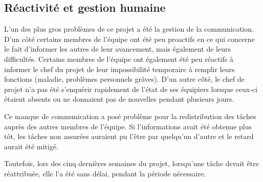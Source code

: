 \subsection{Réactivité et gestion humaine}

L'un des plus gros problèmes de ce projet a été la gestion de
la communication. D'un côté certains membres de l'équipe ont
été peu proactifs en ce qui concerne le fait d'informer les
autres de leur avancement, mais également de leurs
difficultés. Certains membres de l'équipe ont également été
peu réactifs à informer le chef du projet de leur
impossibilité temporaire à remplir leurs fonctions (maladie,
problèmes personnels grâves). D'un autre côté, le chef de
projet n'a pas été s'enquérir rapidement de l'état de ses
équipiers lorsque ceux-ci étaient absents ou ne donnaient pas
de nouvelles pendant plusieurs jours.
\newline

Ce manque de communication a posé problème pour la
redistribution des tâches auprès des autres membres de
l'équipe. Si l'informations avait été obtenue plus tôt, les
tâches non assurées auraient pu l'être par quelqu'un d'autre
et le retard aurait été mitigé.
\newline

Toutefois, lors des cinq dernières semaines du projet,
lorsqu'une tâche devait être réattribuée, elle l'a été sans
délai, pendant la période nécessaire.
